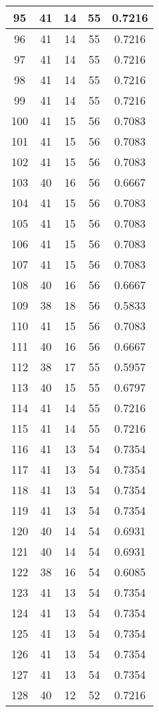 \documentclass[letterpaper, 12pt]{article}
\begin{document}
\begin{longtable}{|c|c|c|c|c|}
\hline
95 & 41 & 14 & 55 & 0.7216 \\
\hline
96 & 41 & 14 & 55 & 0.7216 \\
\hline
97 & 41 & 14 & 55 & 0.7216 \\
\hline
98 & 41 & 14 & 55 & 0.7216 \\
\hline
99 & 41 & 14 & 55 & 0.7216 \\
\hline
100 & 41 & 15 & 56 & 0.7083 \\
\hline
101 & 41 & 15 & 56 & 0.7083 \\
\hline
102 & 41 & 15 & 56 & 0.7083 \\
\hline
103 & 40 & 16 & 56 & 0.6667 \\
\hline
104 & 41 & 15 & 56 & 0.7083 \\
\hline
105 & 41 & 15 & 56 & 0.7083 \\
\hline
106 & 41 & 15 & 56 & 0.7083 \\
\hline
107 & 41 & 15 & 56 & 0.7083 \\
\hline
108 & 40 & 16 & 56 & 0.6667 \\
\hline
109 & 38 & 18 & 56 & 0.5833 \\
\hline
110 & 41 & 15 & 56 & 0.7083 \\
\hline
111 & 40 & 16 & 56 & 0.6667 \\
\hline
112 & 38 & 17 & 55 & 0.5957 \\
\hline
113 & 40 & 15 & 55 & 0.6797 \\
\hline
114 & 41 & 14 & 55 & 0.7216 \\
\hline
115 & 41 & 14 & 55 & 0.7216 \\
\hline
116 & 41 & 13 & 54 & 0.7354 \\
\hline
117 & 41 & 13 & 54 & 0.7354 \\
\hline
118 & 41 & 13 & 54 & 0.7354 \\
\hline
119 & 41 & 13 & 54 & 0.7354 \\
\hline
120 & 40 & 14 & 54 & 0.6931 \\
\hline
121 & 40 & 14 & 54 & 0.6931 \\
\hline
122 & 38 & 16 & 54 & 0.6085 \\
\hline
123 & 41 & 13 & 54 & 0.7354 \\
\hline
124 & 41 & 13 & 54 & 0.7354 \\
\hline
125 & 41 & 13 & 54 & 0.7354 \\
\hline
126 & 41 & 13 & 54 & 0.7354 \\
\hline
127 & 41 & 13 & 54 & 0.7354 \\
\hline
128 & 40 & 12 & 52 & 0.7216 \\

\end{longtable}
\end{document}
